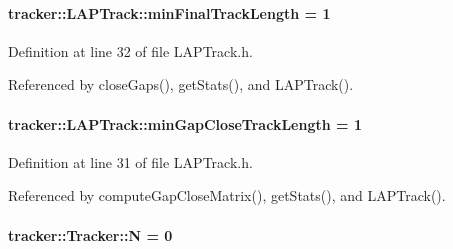 \paragraph[{\texorpdfstring{min\+Final\+Track\+Length}{minFinalTrackLength}}]{ tracker\+::\+L\+A\+P\+Track\+::min\+Final\+Track\+Length = 1}\hypertarget{classtracker_1_1LAPTrack_a9a856327b91dddeb277b8a3633184cb3}{}\label{classtracker_1_1LAPTrack_a9a856327b91dddeb277b8a3633184cb3}


Definition at line 32 of file L\+A\+P\+Track.\+h.



Referenced by close\+Gaps(), get\+Stats(), and L\+A\+P\+Track().

\paragraph[{\texorpdfstring{min\+Gap\+Close\+Track\+Length}{minGapCloseTrackLength}}]{ tracker\+::\+L\+A\+P\+Track\+::min\+Gap\+Close\+Track\+Length = 1}\hypertarget{classtracker_1_1LAPTrack_a580b1ec32d1e21c40e5a19f3f26518b4}{}\label{classtracker_1_1LAPTrack_a580b1ec32d1e21c40e5a19f3f26518b4}


Definition at line 31 of file L\+A\+P\+Track.\+h.



Referenced by compute\+Gap\+Close\+Matrix(), get\+Stats(), and L\+A\+P\+Track().

\paragraph[{\texorpdfstring{N}{N}}]{ tracker\+::\+Tracker\+::N = 0\hspace{0.3cm}{\ttfamily [inherited]}}\hypertarget{classtracker_1_1Tracker_a5d8cb7831463035649c791311001228f}{}\label{classtracker_1_1Tracker_a5d8cb7831463035649c791311001228f}


